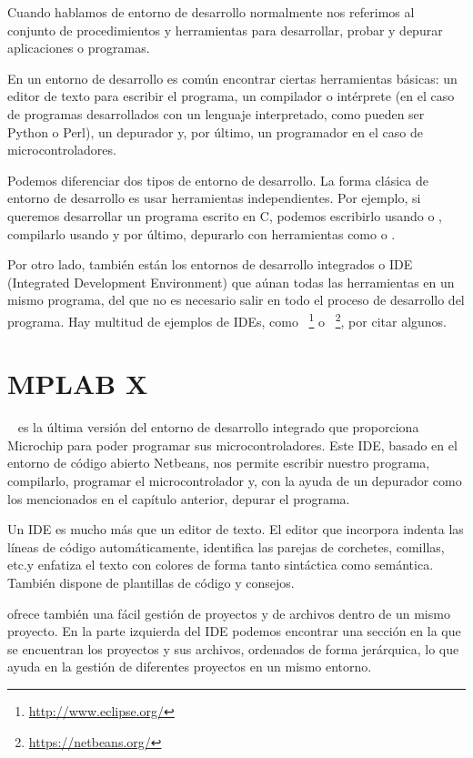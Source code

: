 Cuando hablamos de entorno de desarrollo normalmente nos referimos al conjunto de procedimientos y herramientas para desarrollar, probar y depurar aplicaciones o programas.

En un entorno de desarrollo es común encontrar ciertas herramientas básicas: un editor de texto para escribir el programa, un compilador o intérprete (en el caso de programas desarrollados con un lenguaje interpretado, como pueden ser Python o Perl), un depurador y, por último, un programador en el caso de microcontroladores.

Podemos diferenciar dos tipos de entorno de desarrollo. La forma clásica de entorno de desarrollo es usar herramientas independientes. Por ejemplo, si queremos desarrollar un programa escrito en C, podemos escribirlo usando  o , compilarlo usando  y por último, depurarlo con herramientas como  o .

Por otro lado, también están los entornos de desarrollo integrados o IDE (Integrated Development Environment) que aúnan todas las herramientas en un mismo programa, del que no es necesario salir en todo el proceso de desarrollo del programa. Hay multitud de ejemplos de IDEs, como ~\footnote{\url{http://www.eclipse.org/}} o ~\footnote{\url{https://netbeans.org/}}, por citar algunos.

\section{MPLAB X}
~\cite{website:mplab} es la última versión del entorno de desarrollo integrado que proporciona Microchip para poder programar sus microcontroladores. Este IDE, basado en el entorno de código abierto Netbeans, nos permite escribir nuestro programa, compilarlo, programar el microcontrolador y, con la ayuda de un depurador como los mencionados en el capítulo anterior, depurar el programa.

Un IDE es mucho más que un editor de texto. El editor que incorpora  indenta las líneas de código automáticamente, identifica las parejas de corchetes, comillas, etc.\@ y enfatiza el texto con colores de forma tanto sintáctica como semántica. También dispone de plantillas de código y consejos.

 ofrece también una fácil gestión de proyectos y de archivos dentro de un mismo proyecto. En la parte izquierda del IDE podemos encontrar una sección en la que se encuentran los proyectos y sus archivos, ordenados de forma jerárquica, lo que ayuda en la gestión de diferentes proyectos en un mismo entorno.

